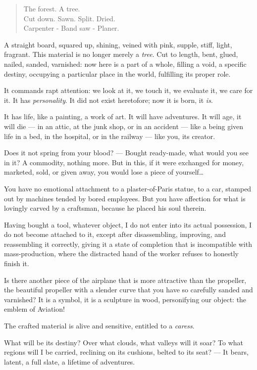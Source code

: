 \documentclass{book}
\begin{document}
\begin{verse}
  The forest. A tree.\\
  Cut down. Sawn. Split. Dried.\\
  Carpenter - Band saw - Planer.
\end{verse}

A straight board, squared up, shining, veined with pink, supple,
stiff, light, fragrant. This material is no longer merely a
\emph{tree}.  Cut to length, bent, glued, nailed, sanded, varnished:
now here is a part of a whole, filling a void, a specific destiny,
occupying a particular place in the world, fulfilling its proper role.

It commands rapt attention: we look at it, we touch it, we evaluate
it, we care for it. It has \textit{personality}. It did not exist
heretofore; now it is born, it \textit{is}.

It has life, like a painting, a work of art. It will have adventures.
It will age, it will die --- in an attic, at the junk shop, or in an
accident --- like a being given life in a bed, in the hospital, or in
the railway --- like you, its creator.

Does it not spring from your blood? --- Bought ready-made, what would
you see in it?  A commodity, nothing more.  But in this, if it were
exchanged for money, marketed, sold, or given away, you would lose a
piece of yourself\ldots

You have no emotional attachment to a plaster-of-Paris statue, to a
car, stamped out by machines tended by bored employees. But you have
affection for what is lovingly carved by a craftsman, because he
placed his soul therein.

Having bought a tool, whatever object, I do not enter into its actual
possession, I do not become attached to it, except after
disassembling, improving, and reassembling it correctly, giving it a
state of completion that is incompatible with mass-production, where
the distracted hand of the worker refuses to honestly finish it.

Is there another piece of the airplane that is more attractive than
the propeller, the beautiful propeller with a slender curve that you
have so carefully sanded and varnished?  It is a symbol, it is a
sculpture in wood, personifying our object: the emblem of Aviation!

The crafted material is alive and sensitive, entitled to a
\textit{caress}.

What will be its destiny? Over what clouds, what valleys will it soar?
To what regions will I be carried, reclining on its cushions, belted
to its seat? --- It bears, latent, a full slate, a lifetime of
adventures.
\end{document}
